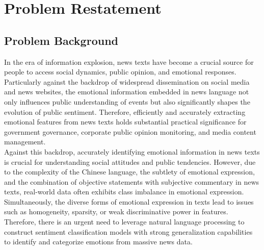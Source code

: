 \chapter{Problem Restatement}
\section{Problem Background}
In the era of information explosion, news texts have become a crucial source for people to access social dynamics, public opinion, and emotional responses. Particularly against the backdrop of widespread dissemination on social media and news websites, the emotional information embedded in news language not only influences public understanding of events but also significantly shapes the evolution of public sentiment. Therefore, efficiently and accurately extracting emotional features from news texts holds substantial practical significance for government governance, corporate public opinion monitoring, and media content management.\\
\indent Against this backdrop, accurately identifying emotional information in news texts is crucial for understanding social attitudes and public tendencies. However, due to the complexity of the Chinese language, the subtlety of emotional expression, and the combination of objective statements with subjective commentary in news texts, real-world data often exhibits class imbalance in emotional expression. Simultaneously, the diverse forms of emotional expression in texts lead to issues such as homogeneity, sparsity, or weak discriminative power in features. Therefore, there is an urgent need to leverage natural language processing to construct sentiment classification models with strong generalization capabilities to identify and categorize emotions from massive news data.

